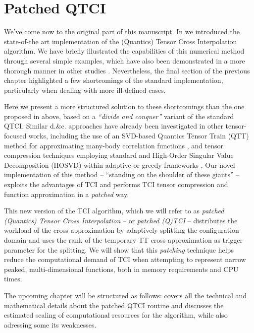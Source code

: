 \chapter{Patched QTCI}
\label{chap:patching}

We've come now to the original part of this manuscript. In  we introduced the state-of-the art implementation of the (Quantics) Tensor Cross Interpolation algorithm. We have briefly illustrated the capabilities of this numerical method through several simple examples, which have also been demonstrated in a more thorough manner in other studies \cite{Fernandez2022, Fernandez2024,
Ritter2024, Jolly2024, Sakurai2025, Oseledets2010, Dolgov2020}. Nevertheless, the final section of the previous chapter highlighted a few shortcomings of the standard implementation, particularly when dealing with more ill-defined cases. 

Here we present a more structured solution to these shortcomings than the one proposed in  above, based on a \textit{``divide and conquer''} variant of the standard QTCI. Similar d.\&c. approaches have already been investigated in other tensor-focused works, including the use of an SVD-based Quantics Tensor Train (QTT) method for approximating many-body correlation functions \cite{Hiroshi2023, Murray2024}, and tensor compression techniques employing standard and High-Order Singular Value Decomposition (HOSVD) within adaptive or greedy frameworks \cite{Ehrlacher2021, FuenteRuizPhDThesis, Ehrlacher2022}. Our novel implementation of this method -- ``standing on the shoulder of these giants'' --  exploits the  advantages of TCI and performs TCI tensor compression and function approximation in a \textit{patched} way. 

This new version of the TCI algorithm, which we will refer to as \textit{patched (Quantics) Tensor Cross Interpolation} -- or \textit{patched (Q)TCI} -- distributes the workload of the cross approximation by adaptively splitting the configuration domain and uses the rank of the temporary TT cross approximation as trigger parameter for the splitting. We will show that this \textit{patching} technique helps reduce the computational demand of TCI when attempting to represent narrow peaked, multi-dimensional functions, both in memory requirements and CPU times. 

The upcoming chapter will be structured as follows:  covers all the technical and mathematical details about the patched QTCI routine and  discusses the estimated scaling of computational resources for the algorithm, while also adressing some its weaknesses.


